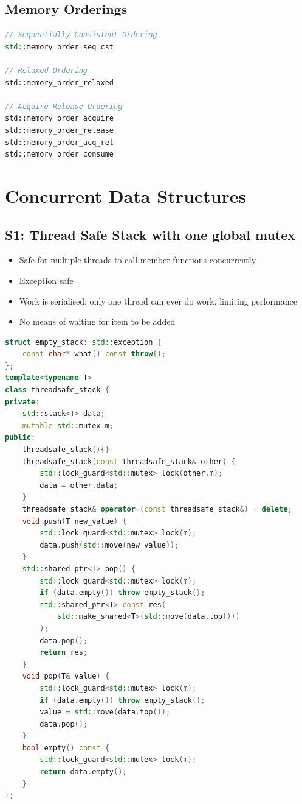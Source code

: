 \documentclass{article}
\begin{document}
\subsection{Memory Orderings}
\begin{lstlisting}[language=C++]
// Sequentially Consistent Ordering
std::memory_order_seq_cst

// Relaxed Ordering
std::memory_order_relaxed

// Acquire-Release Ordering
std::memory_order_acquire
std::memory_order_release
std::memory_order_acq_rel
std::memory_order_consume
\end{lstlisting}

\section{Concurrent Data Structures}

\subsection{S1: Thread Safe Stack with one global mutex}
\begin{itemize}
    \item Safe for multiple threads to call member functions concurrently
    \item Exception safe
    \item Work is serialised; only one thread can ever do work, limiting performance
    \item No means of waiting for item to be added
\end{itemize}
\begin{lstlisting}[language=C++]
struct empty_stack: std::exception {
    const char* what() const throw();
};
template<typename T>
class threadsafe_stack {
private:
    std::stack<T> data;
    mutable std::mutex m;
public:
    threadsafe_stack(){}
    threadsafe_stack(const threadsafe_stack& other) {
        std::lock_guard<std::mutex> lock(other.m);
        data = other.data;
    }
    threadsafe_stack& operator=(const threadsafe_stack&) = delete;
    void push(T new_value) {
        std::lock_guard<std::mutex> lock(m);
        data.push(std::move(new_value));
    }
    std::shared_ptr<T> pop() {
        std::lock_guard<std::mutex> lock(m);
        if (data.empty()) throw empty_stack();
        std::shared_ptr<T> const res(
            std::make_shared<T>(std::move(data.top()))
        );
        data.pop();
        return res;
    }
    void pop(T& value) {
        std::lock_guard<std::mutex> lock(m);
        if (data.empty()) throw empty_stack();
        value = std::move(data.top());
        data.pop();
    }
    bool empty() const {
        std::lock_guard<std::mutex> lock(m);
        return data.empty();
    }
};
\end{lstlisting}
\end{document}
